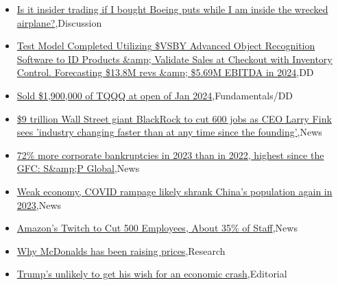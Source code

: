\documentclass{article}%
\begin{document}
%
\begin{itemize}%
\item%
\href{https://reddit.com/r/wallstreetbets/comments/1935frs/is\_it\_insider\_trading\_if\_i\_bought\_boeing\_puts/}{Is it insider trading if I bought Boeing puts while I am inside the wrecked airplane?},Discussion%
\item%
\href{https://reddit.com/r/Baystreetbets/comments/192j3jj/test\_model\_completed\_utilizing\_vsby\_advanced/}{Test Model Completed Utilizing \$VSBY Advanced Object Recognition Software to ID Products \&amp; Validate Sales at Checkout with Inventory Control. Forecasting \$13.8M revs \&amp; \$5.69M EBITDA in 2024},DD%
\item%
\href{https://reddit.com/r/StockMarket/comments/192zsg7/sold\_1900000\_of\_tqqq\_at\_open\_of\_jan\_2024/}{Sold \$1,900,000 of TQQQ at open of Jan 2024},Fundamentals/DD%
\item%
\href{https://reddit.com/r/Economics/comments/1935ubc/9\_trillion\_wall\_street\_giant\_blackrock\_to\_cut\_600/}{\$9 trillion Wall Street giant BlackRock to cut 600 jobs as CEO Larry Fink sees 'industry changing faster than at any time since the founding'},News%
\item%
\href{https://reddit.com/r/Economics/comments/192u75p/72\_more\_corporate\_bankruptcies\_in\_2023\_than\_in/}{72\% more corporate bankruptcies in 2023 than in 2022, highest since the GFC: S\&amp;P Global},News%
\item%
\href{https://reddit.com/r/Economics/comments/192tqd6/weak\_economy\_covid\_rampage\_likely\_shrank\_chinas/}{Weak economy, COVID rampage likely shrank China's population again in 2023},News%
\item%
\href{https://reddit.com/r/Economics/comments/192sqm0/amazons\_twitch\_to\_cut\_500\_employees\_about\_35\_of/}{Amazon's Twitch to Cut 500 Employees, About 35\% of Staff},News%
\item%
\href{https://reddit.com/r/Economics/comments/192opck/why\_mcdonalds\_has\_been\_raising\_prices/}{Why McDonalds has been raising prices},Research%
\item%
\href{https://reddit.com/r/Economics/comments/192ok3g/trumps\_unlikely\_to\_get\_his\_wish\_for\_an\_economic/}{Trump's unlikely to get his wish for an economic crash},Editorial%
\end{itemize}%
\end{document}
